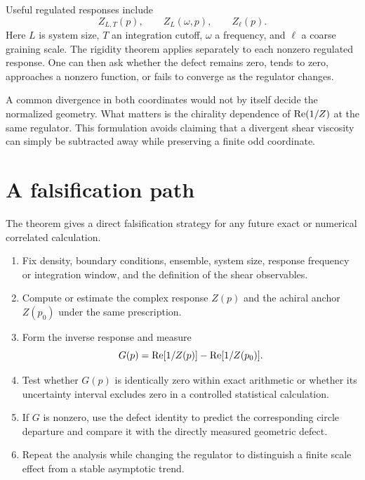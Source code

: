 Useful regulated responses include
\begin{equation}
 Z_{L,T}(p),
 \qquad
 Z_{L}(\omega,p),
 \qquad
 Z_{\ell}(p).
 \label{eq:regulated_responses}
\end{equation}
Here $L$ is system size, $T$ an integration cutoff, $\omega$ a frequency, and $\ell$ a coarse graining scale. The rigidity theorem applies separately to each nonzero regulated response. One can then ask whether the defect remains zero, tends to zero, approaches a nonzero function, or fails to converge as the regulator changes.

A common divergence in both coordinates would not by itself decide the normalized geometry. What matters is the chirality dependence of $\operatorname{Re}(1/Z)$ at the same regulator. This formulation avoids claiming that a divergent shear viscosity can simply be subtracted away while preserving a finite odd coordinate.

\section{A falsification path}
The theorem gives a direct falsification strategy for any future exact or numerical correlated calculation.

\begin{enumerate}[label=\arabic*.]
\item Fix density, boundary conditions, ensemble, system size, response frequency or integration window, and the definition of the shear observables.
\item Compute or estimate the complex response $Z(p)$ and the achiral anchor $Z(p_0)$ under the same prescription.
\item Form the inverse response and measure
\begin{equation}
 G(p)=\operatorname{Re}[1/Z(p)]-\operatorname{Re}[1/Z(p_0)].
 \label{eq:falsification_g}
\end{equation}
\item Test whether $G(p)$ is identically zero within exact arithmetic or whether its uncertainty interval excludes zero in a controlled statistical calculation.
\item If $G$ is nonzero, use the defect identity to predict the corresponding circle departure and compare it with the directly measured geometric defect.
\item Repeat the analysis while changing the regulator to distinguish a finite scale effect from a stable asymptotic trend.
\end{enumerate}

